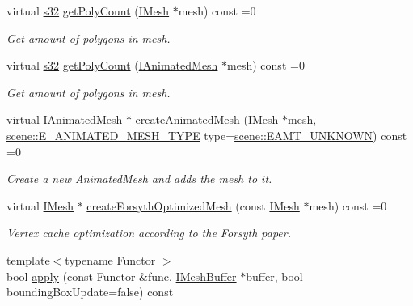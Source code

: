 \begin{DoxyCompactItemize}
virtual \hyperlink{namespaceirr_ac66849b7a6ed16e30ebede579f9b47c6}{s32} \hyperlink{classirr_1_1scene_1_1IMeshManipulator_a914c8cbfbde1428dea91b34fe99e716d}{get\+Poly\+Count} (\hyperlink{classirr_1_1scene_1_1IMesh}{I\+Mesh} $\ast$mesh) const =0
\begin{DoxyCompactList}\small\item\em Get amount of polygons in mesh. \end{DoxyCompactList}\item 
virtual \hyperlink{namespaceirr_ac66849b7a6ed16e30ebede579f9b47c6}{s32} \hyperlink{classirr_1_1scene_1_1IMeshManipulator_af20519dbaa2c2c346e8ddf7c94babc38}{get\+Poly\+Count} (\hyperlink{classirr_1_1scene_1_1IAnimatedMesh}{I\+Animated\+Mesh} $\ast$mesh) const =0
\begin{DoxyCompactList}\small\item\em Get amount of polygons in mesh. \end{DoxyCompactList}\item 
virtual \hyperlink{classirr_1_1scene_1_1IAnimatedMesh}{I\+Animated\+Mesh} $\ast$ \hyperlink{classirr_1_1scene_1_1IMeshManipulator_a08c2483575a88f68d099690932c11562}{create\+Animated\+Mesh} (\hyperlink{classirr_1_1scene_1_1IMesh}{I\+Mesh} $\ast$mesh, \hyperlink{namespaceirr_1_1scene_a2fc85a64604521ca063f1881b5dd1c61}{scene\+::\+E\+\_\+\+A\+N\+I\+M\+A\+T\+E\+D\+\_\+\+M\+E\+S\+H\+\_\+\+T\+Y\+PE} type=\hyperlink{namespaceirr_1_1scene_a2fc85a64604521ca063f1881b5dd1c61a6f44a8730987c53332017ff74048acd0}{scene\+::\+E\+A\+M\+T\+\_\+\+U\+N\+K\+N\+O\+WN}) const =0
\begin{DoxyCompactList}\small\item\em Create a new Animated\+Mesh and adds the mesh to it. \end{DoxyCompactList}\item 
virtual \hyperlink{classirr_1_1scene_1_1IMesh}{I\+Mesh} $\ast$ \hyperlink{classirr_1_1scene_1_1IMeshManipulator_a5003ca5eabee96fe1c871bdb25ae43fd}{create\+Forsyth\+Optimized\+Mesh} (const \hyperlink{classirr_1_1scene_1_1IMesh}{I\+Mesh} $\ast$mesh) const =0
\begin{DoxyCompactList}\small\item\em Vertex cache optimization according to the Forsyth paper. \end{DoxyCompactList}\item 
{\footnotesize template$<$typename Functor $>$ }\\bool \hyperlink{classirr_1_1scene_1_1IMeshManipulator_a6d685fb465a8b5efecd0825b74099ceb}{apply} (const Functor \&func, \hyperlink{classirr_1_1scene_1_1IMeshBuffer}{I\+Mesh\+Buffer} $\ast$buffer, bool bounding\+Box\+Update=false) const

\end{DoxyCompactItemize}

